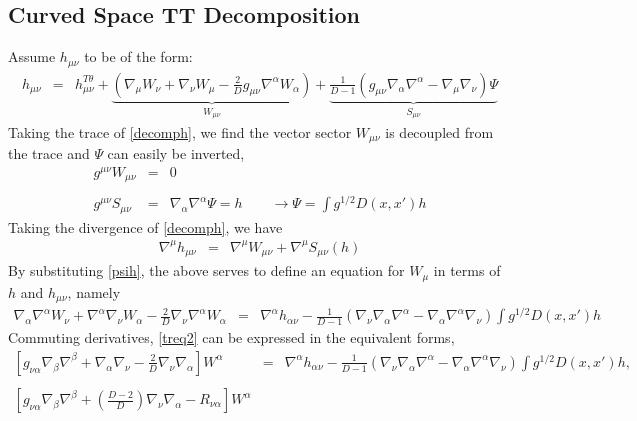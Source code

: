 \documentclass[10pt,letterpaper]{article}
\numberwithin{equation}{section}
\begin{document}
\begin{appendices}
\section{Curved Space TT Decomposition}
%
Assume $h_{\mu\nu}$ to be of the form:
\begin{eqnarray}
h_{\mu\nu} &=& h_{\mu\nu}^{T\theta} + \underbrace{\left(\nabla_\mu W_\nu + \nabla_\nu W_\mu - \frac{2}{D}g_{\mu\nu}\nabla^\alpha W_\alpha\right)}_{W_{\mu\nu}} + \underbrace{\frac{1}{D-1}\left( g_{\mu\nu}\nabla_\alpha \nabla^\alpha - \nabla_\mu\nabla_\nu\right)\Psi}_{S_{\mu\nu}}
\label{decomph}
\end{eqnarray}
Taking the trace of \eqref{decomph}, we find the vector sector $W_{\mu\nu}$ is decoupled from the trace and $\Psi$ can easily be inverted,
\begin{eqnarray}
g^{\mu\nu}W_{\mu\nu} &=& 0
\\ \nonumber\\
g^{\mu\nu}S_{\mu\nu} &=& \nabla_\alpha\nabla^\alpha \Psi = h
\qquad
\to \Psi = \int g^{1/2} D(x,x') h
\label{psih}
\end{eqnarray}
Taking the divergence of \eqref{decomph}, we have
\begin{eqnarray}
\nabla^\mu h_{\mu\nu} &=& \nabla^\mu W_{\mu\nu} + \nabla^\mu S_{\mu\nu}(h)
\label{treq1}
\end{eqnarray}
By substituting \eqref{psih}, the above serves to define an equation for $W_{\mu}$ in terms of $h$ and $h_{\mu\nu}$, namely
\begin{eqnarray}
\nabla_\alpha \nabla^\alpha W_\nu +\nabla^\alpha \nabla_\nu W_\alpha - \frac{2}{D}\nabla_\nu\nabla^\alpha W_\alpha &=&
\nabla^\alpha h_{\alpha\nu} - \frac{1}{D-1}\left(\nabla_\nu \nabla_\alpha\nabla^\alpha - \nabla_\alpha\nabla^\alpha \nabla_\nu\right)
\int g^{1/2} D(x,x') h
\label{treq2}
\end{eqnarray}
Commuting derivatives, \eqref{treq2} can be expressed in the equivalent forms,
\begin{eqnarray}
\left[g_{\nu\alpha} \nabla_\beta \nabla^\beta +\nabla_\alpha \nabla_\nu - \frac{2}{D}\nabla_\nu\nabla_\alpha\right] W^\alpha &=&
\nabla^\alpha h_{\alpha\nu} - \frac{1}{D-1}\left(\nabla_\nu \nabla_\alpha\nabla^\alpha - \nabla_\alpha\nabla^\alpha \nabla_\nu\right)
\int g^{1/2} D(x,x') h,
\label{treq3}
\\ \nonumber\\
\left[g_{\nu\alpha}\nabla_\beta\nabla^\beta + \left(\frac{D-2}{D}\right)\nabla_\nu \nabla_\alpha - R_{\nu\alpha}\right]W^\alpha

\end{eqnarray}
\end{appendices}
\end{document}
